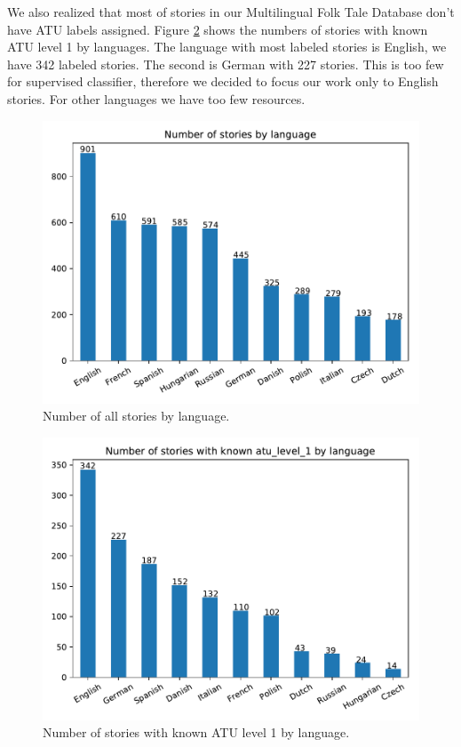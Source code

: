 \documentclass[a4paper]{article}
\begin{document}
We also realized that most of stories in our Multilingual Folk Tale
Database don't have ATU labels assigned. Figure \ref{fig:bar2} shows the
numbers of stories with known ATU level 1 by languages.
The language with most labeled stories is English, we have 342 labeled
stories. The second is German with 227 stories. This is too few for
supervised classifier, therefore we decided to focus our work only to
English stories. For other languages we have too few resources.

\begin{figure}
\centering
\includegraphics[width=0.9\linewidth]{plots/bars1.pdf}
\caption{Number of all stories by language.}
\label{fig:bar1}
\end{figure}

\begin{figure}
\centering
\includegraphics[width=0.9\linewidth]{plots/bars2.pdf}
\caption{Number of stories with known ATU level 1 by language.}
\label{fig:bar2}
\end{figure}
\end{document}
